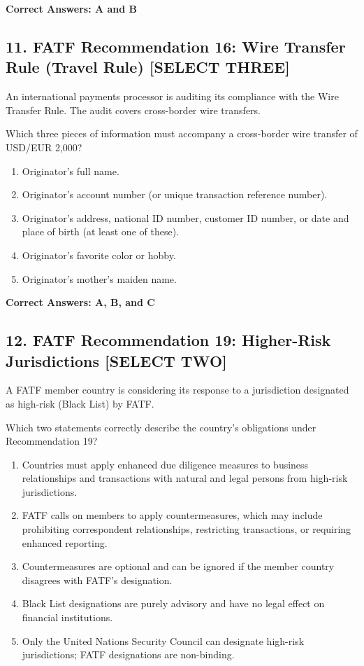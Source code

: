 \documentclass[11pt,a4paper]{article}
\begin{document}
	\textbf{Correct Answers: A and B}
	
	\subsection{11. FATF Recommendation 16: Wire Transfer Rule (Travel Rule) \textnormal{[SELECT THREE]}}
	
	An international payments processor is auditing its compliance with the Wire Transfer Rule. The audit covers cross-border wire transfers.
	
	Which three pieces of information must accompany a cross-border wire transfer of USD/EUR 2,000?
	
	\begin{enumerate}[label=\Alph*.]
		\item Originator's full name.
		\item Originator's account number (or unique transaction reference number).
		\item Originator's address, national ID number, customer ID number, or date and place of birth (at least one of these).
		\item Originator's favorite color or hobby.
		\item Originator's mother's maiden name.
	\end{enumerate}
	
	\textbf{Correct Answers: A, B, and C}
	
	\subsection{12. FATF Recommendation 19: Higher-Risk Jurisdictions \textnormal{[SELECT TWO]}}
	
	A FATF member country is considering its response to a jurisdiction designated as high-risk (Black List) by FATF.
	
	Which two statements correctly describe the country's obligations under Recommendation 19?
	
	\begin{enumerate}[label=\Alph*.]
		\item Countries must apply enhanced due diligence measures to business relationships and transactions with natural and legal persons from high-risk jurisdictions.
		\item FATF calls on members to apply countermeasures, which may include prohibiting correspondent relationships, restricting transactions, or requiring enhanced reporting.
		\item Countermeasures are optional and can be ignored if the member country disagrees with FATF's designation.
		\item Black List designations are purely advisory and have no legal effect on financial institutions.
		\item Only the United Nations Security Council can designate high-risk jurisdictions; FATF designations are non-binding.
	\end{enumerate}
	
\end{document}
